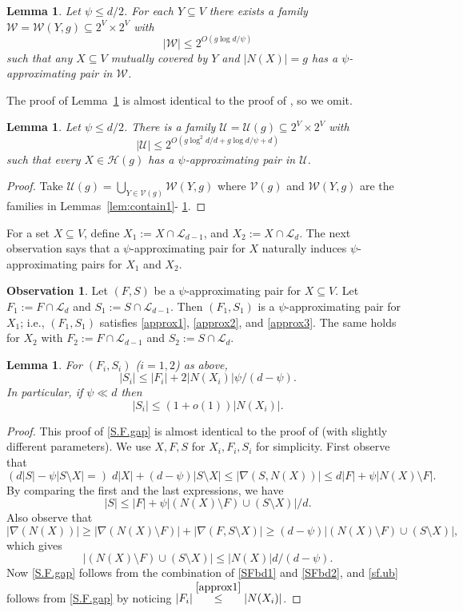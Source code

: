 \documentclass{amsart}
\newtheorem{lem}[thm]{Lemma}
\theoremstyle{definition}
\newtheorem{obs}[thm]{Observation}
\newcommand{\cH}{\mathcal{H} }
\newcommand{\cL}{\mathcal{L} }
\newcommand{\cU}{\mathcal{U} }
\newcommand{\cV}{\mathcal{V} }
\newcommand{\cW}{\mathcal{W} }
\newcommand{\beq}[1]{\begin{equation}\label{#1}}
\newcommand{\enq}[0]{\end{equation}}
\newcommand{\nin}[0]{\noindent}
\newcommand{\sub}[0]{\subseteq}
\newcommand{\0}[0]{\emptyset}
\begin{document}
\begin{lem}\label{lem:contain2}
Let $\psi\leq d/2$. For each $Y\subseteq V$ there exists a family $\mathcal{W}=\mathcal{W}(Y, g)\subseteq 2^V\times 2^V$ with 
\[
|\mathcal{W}|\leq 2^{O(g \log d/\psi)}
\]
such that any $X\subseteq V$ mutually covered by $Y$ and $|N(X)|=g$ has a $\psi$-approximating pair in $\mathcal{W}$.
\end{lem}
\nin The proof of Lemma~\ref{lem:contain2} is almost identical to the proof of \cite[Lemma 7.5]{JK}, so we omit.
\begin{lem}\label{lem:container}
Let $\psi \le d/2$. There is a family $\cU=\cU(g) \sub 2^V \times 2^V$ with
\[|\cU|\le 2^{O(g\log^2 d/d + g\log d/\psi+d)}\]
such that every $X \in \cH(g)$ has a $\psi$-approximating pair in $\cU$.
\end{lem}

\begin{proof}
Take $\cU(g)=\bigcup_{Y \in \cV(g)}\cW(Y,g)$ where $\cV(g)$ and $\cW(Y,g)$ are the families in Lemmas~\ref{lem:contain1}- \ref{lem:contain2}.
\end{proof}

For a set $X\subseteq V$, define $X_1:=X \cap \cL_{d-1}$, and $X_2:=X \cap \cL_d$. The next observation says that a $\psi$-approximating pair for $X$ naturally induces $\psi$-approximating pairs for $X_1$ and $X_2$.

\begin{obs}\label{prop:SFappro1}
Let $(F,S)$ be a $\psi$-approximating pair for $X \sub V$. Let $F_1:=F \cap \cL_d$ and $S_1:=S \cap \cL_{d-1}$. 
Then $(F_1, S_1)$ is a $\psi$-approximating pair for $X_1$; i.e., $(F_1,S_1)$ satisfies \eqref{approx1}, \eqref{approx2}, and \eqref{approx3}. The same holds for $X_2$ with $F_2 :=F \cap \cL_{d-1}$ and $S_2:=S \cap \cL_d$.
\end{obs}

\begin{lem}
For $(F_i,S_i)$ ($i=1,2$) as above,
\beq{S.F.gap} |S_i|\le |F_i|+2|N(X_i)|\psi/(d-\psi).\enq
In particular, if $\psi \ll d$ then
\beq{sf.ub} |S_i| \le (1+o(1))|N(X_i)|.\enq
\end{lem}

\begin{proof} 
This proof of \eqref{S.F.gap} is almost identical to the proof of \cite[Lemma 5.3]{GS} (with slightly different parameters).
We use $X, F, S$ for $X_i, F_i, S_i$ for simplicity. First observe that
\[(d|S|-\psi|S \setminus X|=) \; d|X|+(d-\psi)|S \setminus X| \le |\nabla(S,N(X))|\le d|F|+\psi|N(X) \setminus F|.\]
By comparing the first and the last expressions, we have
\beq{SFbd1} |S| \le |F|+\psi|(N(X) \setminus F) \cup (S \setminus X)|/d.\enq
Also observe that
\[|\nabla(N(X))| \ge |\nabla(N(X) \setminus F)|+|\nabla(F, S \setminus X)| \ge (d-\psi)|(N(X) \setminus F) \cup (S \setminus X)|, \]
which gives
\beq{SFbd2} |(N(X) \setminus F) \cup (S \setminus X)| \le |N(X)|d/(d-\psi).\enq
Now \eqref{S.F.gap} follows from the combination of \eqref{SFbd1} and \eqref{SFbd2}, and \eqref{sf.ub} follows from \eqref{S.F.gap} by noticing $|F_i| \stackrel{\eqref{approx1}}{\le} |N(X_i)|$.
\end{proof}
\end{document}
